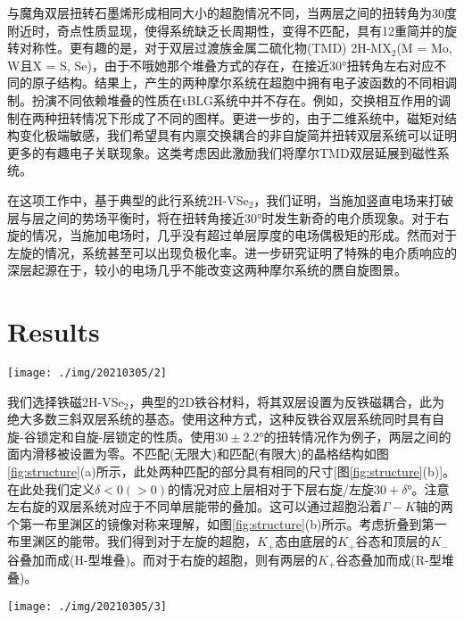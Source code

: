 \documentclass[reprint, aps, prb, showkeys]{revtex4-2}
\begin{document}
与魔角双层扭转石墨烯形成相同大小的超胞情况不同，当两层之间的扭转角为30度附近时，奇点性质显现，使得系统缺乏长周期性，变得不匹配，具有12重简并的旋转对称性。更有趣的是，对于双层过渡族金属二硫化物(TMD) 2H-MX$_2$(M = Mo, W且X = S, Se)，由于不哦她那个堆叠方式的存在，在接近30°扭转角左右对应不同的原子结构。结果上，产生的两种摩尔系统在超胞中拥有电子波函数的不同相调制。扮演不同依赖堆叠的性质在tBLG系统中并不存在。例如，交换相互作用的调制在两种扭转情况下形成了不同的图样。更进一步的，由于二维系统中，磁矩对结构变化极端敏感，我们希望具有内禀交换耦合的非自旋简并扭转双层系统可以证明更多的有趣电子关联现象。这类考虑因此激励我们将摩尔TMD双层延展到磁性系统。

在这项工作中，基于典型的此行系统2H-VSe$_2$，我们证明，当施加竖直电场来打破层与层之间的势场平衡时，将在扭转角接近30°时发生新奇的电介质现象。对于右旋的情况，当施加电场时，几乎没有超过单层厚度的电场偶极矩的形成。然而对于左旋的情况，系统甚至可以出现负极化率。进一步研究证明了特殊的电介质响应的深层起源在于，较小的电场几乎不能改变这两种摩尔系统的赝自旋图景。

\section{Results}
\begin{figure*}[t]
    \texttt{[image: ./img/20210305/2]}
    \caption{\label{fig:band} 
    使用SOC计算的32.2°(a-c)和27.8°(d-f)情况。对于K谷抛物线型能带的描述，我们使用点划线和实线来表示顶层和底层，自旋向上(红色)和自旋向下(蓝色)区分。
    }
\end{figure*}

我们选择铁磁2H-VSe$_2$，典型的2D铁谷材料，将其双层设置为反铁磁耦合，此为绝大多数三斜双层系统的基态。使用这种方式，这种反铁谷双层系统同时具有自旋-谷锁定和自旋-层锁定的性质。使用$30 \pm 2.2°$的扭转情况作为例子，两层之间的面内滑移被设置为零。不匹配(无限大)和匹配(有限大)的晶格结构如图\ref{fig:structure}(a)所示，此处两种匹配的部分具有相同的尺寸[图\ref{fig:structure}(b)]。在此处我们定义$\delta < 0 (>0)$的情况对应上层相对于下层右旋/左旋$30 + \delta °$。注意左右旋的双层系统对应于不同单层能带的叠加。这可以通过超胞沿着$\Gamma - K$轴的两个第一布里渊区的镜像对称来理解，如图\ref{fig:structure}(b)所示。考虑折叠到第一布里渊区的能带。我们得到对于左旋的超胞，$K_+$态由底层的$K_+$谷态和顶层的$K_-$谷叠加而成(H-型堆叠)。而对于右旋的超胞，则有两层的$K_+$谷态叠加而成(R-型堆叠)。

\begin{figure*}[t]
    \texttt{[image: ./img/20210305/3]}
    \caption{\label{fig:polarization} 
    (a)$\Delta P(E)$计算值随着电场强度E的演化；(b)引入的底层在0.001V/A的电场中的平面电荷分布，左旋情况(左图)和右旋情况(右图)。引入电场的电荷密度$\Delta\rho = \rho(E) - \rho(0)$；黄色和青色代表电荷的积累和耗尽。橘色箭头标记了电场的方向。(c)引入的平均电子电荷，沿着z轴的$\Delta\rho = \rho(R) - \rho(L)$，当双层系统从右旋转到左旋。
    }
\end{figure*}
\end{document}
